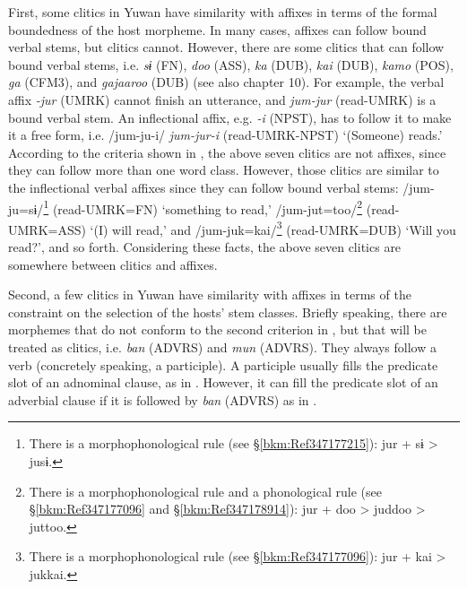 First, some clitics in Yuwan have similarity with affixes in terms of the formal boundedness of the host morpheme. In many cases, affixes can follow bound verbal stems, but clitics cannot. However, there are some clitics that can follow bound verbal stems, i.e. \textit{sɨ} (FN), \textit{doo} (ASS), \textit{ka} (DUB), \textit{kai} (DUB), \textit{kamo} (POS), \textit{ga} (CFM3), and \textit{gajaaroo} (DUB) (see also chapter 10). For example, the verbal affix \textit{{}-jur} (UMRK) cannot finish an utterance, and \textit{jum-jur} (read-UMRK) is a bound verbal stem. An inflectional affix, e.g. \textit{{}-i} (NPST), has to follow it to make it a free form, i.e. /jum-ju-i/ \textit{jum-jur-i} (read-UMRK-NPST) ‘(Someone) reads.’ According to the criteria shown in , the above seven clitics are not affixes, since they can follow more than one word class. However, those clitics are similar to the inflectional verbal affixes since they can follow bound verbal stems: /jum-ju=sɨ/\footnote{There is a morphophonological rule (see §\ref{bkm:Ref347177215}): jur + sɨ > jusɨ.} (read-UMRK=FN) ‘something to read,’ /jum-jut=too/\footnote{There is a morphophonological rule and a phonological rule (see §\ref{bkm:Ref347177096} and §\ref{bkm:Ref347178914}): jur + doo > juddoo > juttoo.} (read-UMRK=ASS) ‘(I) will read,’ and /jum-juk=kai/\footnote{There is a morphophonological rule (see §\ref{bkm:Ref347177096}): jur + kai > jukkai.} (read-UMRK=DUB) ‘Will you read?’, and so forth. Considering these facts, the above seven clitics are somewhere between clitics and affixes.

Second, a few clitics in Yuwan have similarity with affixes in terms of the constraint on the selection of the hosts’ stem classes. Briefly speaking, there are morphemes that do not conform to the second criterion in , but that will be treated as clitics, i.e. \textit{ban} (ADVRS) and \textit{mun} (ADVRS). They always follow a verb (concretely speaking, a participle). A participle usually fills the predicate slot of an adnominal clause, as in \REF{}. However, it can fill the predicate slot of an adverbial clause if it is followed by \textit{ban} (ADVRS) as in .


